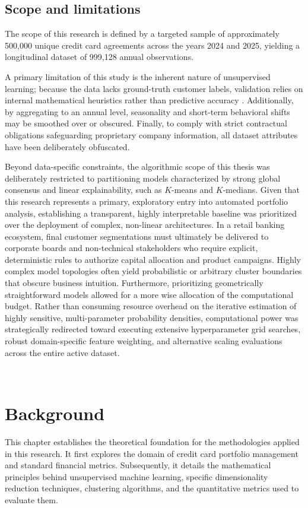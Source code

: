 \section{Scope and limitations}
    \label{sec:limitations}
    The scope of this research is defined by a targeted sample of approximately 500,000 unique credit card agreements across the years 2024 and 2025, yielding a longitudinal dataset of 999,128 annual observations.

    A primary limitation of this study is the inherent nature of unsupervised learning; because the data lacks ground-truth customer labels, validation relies on internal mathematical heuristics rather than predictive accuracy \cite{naeem_unsupervised_2023}. Additionally, by aggregating to an annual level, seasonality and short-term behavioral shifts may be smoothed over or obscured. Finally, to comply with strict contractual obligations safeguarding proprietary company information, all dataset attributes have been deliberately obfuscated.

    Beyond data-specific constraints, the algorithmic scope of this thesis was deliberately restricted to partitioning models characterized by strong global consensus and linear explainability, such as $K$-means and $K$-medians. Given that this research represents a primary, exploratory entry into automated portfolio analysis, establishing a transparent, highly interpretable baseline was prioritized over the deployment of complex, non-linear architectures. In a retail banking ecosystem, final customer segmentations must ultimately be delivered to corporate boards and non-technical stakeholders who require explicit, deterministic rules to authorize capital allocation and product campaigns. Highly complex model topologies often yield probabilistic or arbitrary cluster boundaries that obscure business intuition. Furthermore, prioritizing geometrically straightforward models allowed for a more wise allocation of the computational budget. Rather than consuming resource overhead on the iterative estimation of highly sensitive, multi-parameter probability densities, computational power was strategically redirected toward executing extensive hyperparameter grid searches, robust domain-specific feature weighting, and alternative scaling evaluations across the entire active dataset.
    
    \newEmptyPage\

\chapter{Background}
\label{chap:Background}
This chapter establishes the theoretical foundation for the methodologies applied in this research.
It first explores the domain of credit card portfolio management and standard financial metrics.
Subsequently, it details the mathematical principles behind unsupervised machine learning, specific dimensionality reduction techniques, clustering algorithms, and the quantitative metrics used to evaluate them.
    
